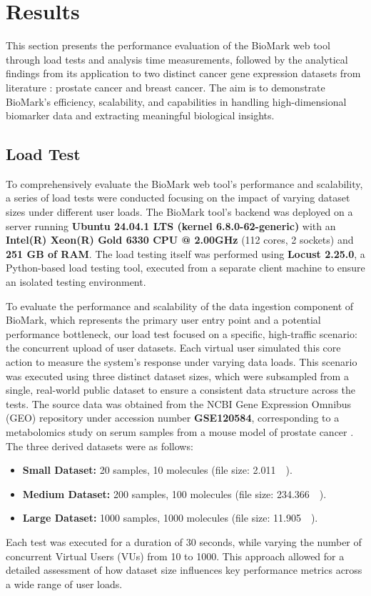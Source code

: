 \documentclass[journal]{IEEEtran}
\begin{document}
\section{Results}
This section presents the performance evaluation of the BioMark web tool through load tests and analysis time measurements, followed by the analytical findings from its application to two distinct cancer gene expression datasets from literature \cite{Benedetti2023_MultimodalAtlas}: prostate cancer and breast cancer. The aim is to demonstrate BioMark's efficiency, scalability, and capabilities in handling high-dimensional biomarker data and extracting meaningful biological insights.

\subsection{Load Test}
To comprehensively evaluate the BioMark web tool’s performance and scalability, a series of load tests were conducted focusing on the impact of varying dataset sizes under different user loads. The BioMark tool's backend was deployed on a server running \textbf{Ubuntu 24.04.1 LTS (kernel 6.8.0-62-generic)} with an \textbf{Intel(R) Xeon(R) Gold 6330 CPU @ 2.00GHz} (112 cores, 2 sockets) and \textbf{251 GB of RAM}. The load testing itself was performed using \textbf{Locust 2.25.0}, a Python-based load testing tool, executed from a separate client machine to ensure an isolated testing environment.

To evaluate the performance and scalability of the data ingestion component of BioMark, which represents the primary user entry point and a potential performance bottleneck, our load test focused on a specific, high-traffic scenario: the concurrent upload of user datasets. Each virtual user simulated this core action to measure the system's response under varying data loads. This scenario was executed using three distinct dataset sizes, which were subsampled from a single, real-world public dataset to ensure a consistent data structure across the tests. The source data was obtained from the NCBI Gene Expression Omnibus (GEO) repository under accession number \textbf{GSE120584}, corresponding to a metabolomics study on serum samples from a mouse model of prostate cancer \cite{benedetti2019elife}. The three derived datasets were as follows:


\begin{itemize}
\item \textbf{Small Dataset:} 20 samples, 10 molecules (file size: \SI{2.011}{\kilo\byte}).
\item \textbf{Medium Dataset:} 200 samples, 100 molecules (file size: \SI{234.366}{\kilo\byte}).
\item \textbf{Large Dataset:} 1000 samples, 1000 molecules (file size: \SI{11.905}{\mega\byte}).
\end{itemize}
Each test was executed for a duration of 30 seconds, while varying the number of concurrent Virtual Users (VUs) from 10 to 1000. This approach allowed for a detailed assessment of how dataset size influences key performance metrics across a wide range of user loads.
\end{document}
